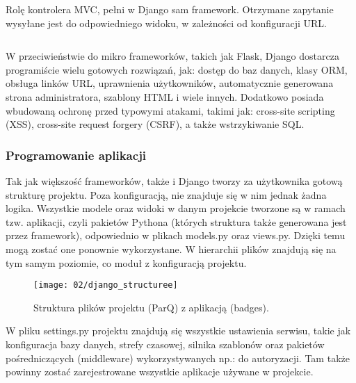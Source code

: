 Rolę kontrolera MVC, pełni w Django sam framework. Otrzymane zapytanie wysyłane jest do odpowiedniego widoku, w zależności od konfiguracji URL.

\begin{singlespace}
	\vspace{0.3cm}
	\inputminted[fontsize=\footnotesize]{python}{src/urls.py}
	\label{l:url}
\end{singlespace}

W przeciwieństwie do mikro frameworków, takich jak Flask, Django dostarcza programiście wielu gotowych rozwiązań, jak: dostęp do baz danych, klasy ORM, obsługa linków URL, uprawnienia użytkowników, automatycznie generowana strona administratora, szablony HTML i wiele innych. Dodatkowo posiada wbudowaną ochronę przed typowymi atakami, takimi jak: cross-site scripting (XSS), cross-site request forgery (CSRF), a także wstrzykiwanie SQL.

\subsubsection*{Programowanie aplikacji}

Tak jak większość frameworków, także i Django tworzy za użytkownika gotową strukturę projektu. Poza konfiguracją, nie znajduje się w nim jednak żadna logika. Wszystkie modele oraz widoki w danym projekcie tworzone są w ramach tzw. aplikacji, czyli pakietów Pythona (których struktura także generowana jest przez framework), odpowiednio w plikach models.py oraz views.py. Dzięki temu mogą zostać one ponownie wykorzystane. W hierarchii plików znajdują się na tym samym poziomie, co moduł z konfiguracją projektu. 

\begin{figure}[h]
	\begin{center}
		\texttt{[image: 02/django\_structuree]}
	\end{center}
	\caption{Struktura plików projektu (ParQ) z aplikacją (badges).}
	\vspace{-0.3cm}
\end{figure}

W pliku settings.py projektu znajdują się wszystkie ustawienia serwisu, takie jak konfiguracja bazy danych, strefy czasowej, silnika szablonów oraz pakietów pośredniczących (middleware) wykorzystywanych np.: do autoryzacji. Tam także powinny zostać zarejestrowane wszystkie aplikacje używane w projekcie.

